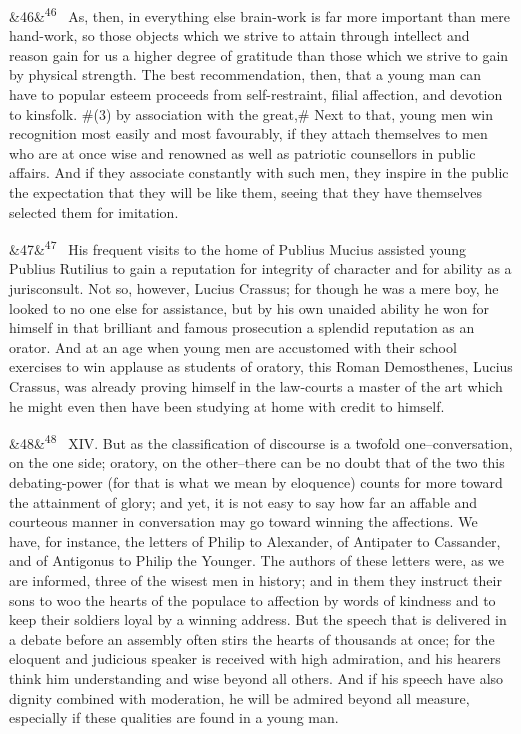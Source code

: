 \documentclass[12pt]{article}
\newcommand{\para}[1][]{\par\noindent\ifx&#1&\else\textsuperscript{\footnotesize #1}~\fi}
\begin{document}
\para[46] As, then, in everything else brain-work is far more important than mere hand-work, so those objects which we strive to attain through intellect and reason gain for us a higher degree of gratitude than those which we strive to gain by physical strength. The best recommendation, then, that a young man can have to popular esteem proceeds from self-restraint, filial affection, and devotion to kinsfolk. \#(3) by association with the great,\# Next to that, young men win recognition most easily and most favourably, if they attach themselves to men who are at once wise and renowned as well as patriotic counsellors in public affairs. And if they associate constantly with such men, they inspire in the public the expectation that they will be like them, seeing that they have themselves selected them for imitation.

\para[47] His frequent visits to the home of Publius Mucius assisted young Publius Rutilius to gain a reputation for integrity of character and for ability as a jurisconsult. Not so, however, Lucius Crassus; for though he was a mere boy, he looked to no one else for assistance, but by his own unaided ability he won for himself in that brilliant and famous prosecution a splendid reputation as an orator. And at an age when young men are accustomed with their school exercises to win applause as students of oratory, this Roman Demosthenes, Lucius Crassus, was already proving himself in the law-courts a master of the art which he might even then have been studying at home with credit to himself.

\para[48] XIV. But as the classification of discourse is a twofold one--conversation, on the one side; oratory, on the other--there can be no doubt that of the two this debating-power (for that is what we mean by eloquence) counts for more toward the attainment of glory; and yet, it is not easy to say how far an affable and courteous manner in conversation may go toward winning the affections. We have, for instance, the letters of Philip to Alexander, of Antipater to Cassander, and of Antigonus to Philip the Younger. The authors of these letters were, as we are informed, three of the wisest men in history; and in them they instruct their sons to woo the hearts of the populace to affection by words of kindness and to keep their soldiers loyal by a winning address. But the speech that is delivered in a debate before an assembly often stirs the hearts of thousands at once; for the eloquent and judicious speaker is received with high admiration, and his hearers think him understanding and wise beyond all others. And if his speech have also dignity combined with moderation, he will be admired beyond all measure, especially if these qualities are found in a young man.
\end{document}

